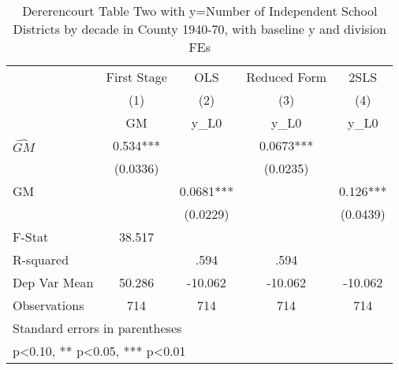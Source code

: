 \begin{table}[htbp]\centering
\def\sym#1{\ifmmode^{#1}\else\(^{#1}\)\fi}
\caption{Dererencourt Table Two with y=Number of Independent School Districts by decade in County 1940-70, with baseline y and division FEs}
\begin{tabular}{l*{4}{c}}
\toprule
                    & First Stage   &         OLS   &Reduced Form   &        2SLS   \\
                    &\multicolumn{1}{c}{(1)}&\multicolumn{1}{c}{(2)}&\multicolumn{1}{c}{(3)}&\multicolumn{1}{c}{(4)}\\
                    &\multicolumn{1}{c}{GM}&\multicolumn{1}{c}{y\_L0}&\multicolumn{1}{c}{y\_L0}&\multicolumn{1}{c}{y\_L0}\\
\midrule
$\hat{GM}$          &       0.534***&               &      0.0673***&               \\
                    &    (0.0336)   &               &    (0.0235)   &               \\
\addlinespace
GM                  &               &      0.0681***&               &       0.126***\\
                    &               &    (0.0229)   &               &    (0.0439)   \\
\midrule
F-Stat              &      38.517   &               &               &               \\
R-squared           &               &        .594   &        .594   &               \\
Dep Var Mean        &      50.286   &     -10.062   &     -10.062   &     -10.062   \\
Observations        &         714   &         714   &         714   &         714   \\
\bottomrule
\multicolumn{5}{l}{\footnotesize Standard errors in parentheses}\\
\multicolumn{5}{l}{\footnotesize * p<0.10, ** p<0.05, *** p<0.01}\\
\end{tabular}
\end{table}
